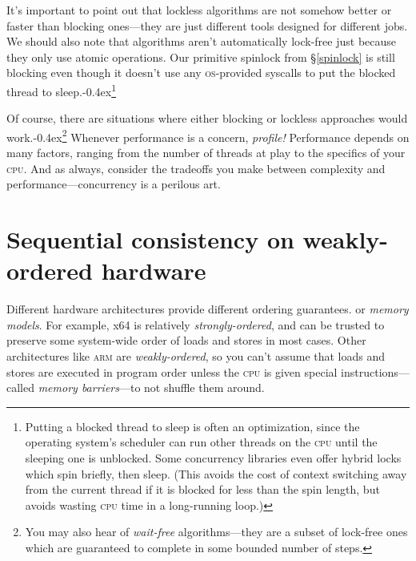 \documentclass[fontsize=\bodyfontsize, numbers=endperiod]{scrartcl}
\newcommand{\punckern}{\kern-0.4ex}
\newcommand{\introduce}[1]{\textit{#1}}
\newcommand{\secref}[1]{\hyperref[#1]{\textsc{\S}\ref*{#1}}}
\begin{document}
\begin{multicols}{2}
It's important to point out that lockless algorithms are not somehow better
or faster than blocking ones---they are just different tools
designed for different jobs.
We should also note that algorithms aren't automatically lock-free just because
they only use atomic operations.
Our primitive spinlock from \secref{spinlock} is still blocking
even though it doesn't use any \textsc{os}-provided syscalls to
put the blocked thread to sleep.\punckern\footnote{Putting a blocked thread
to sleep is often an optimization,
since the operating system's scheduler can run other threads on the \textsc{cpu}
until the sleeping one is unblocked.
Some concurrency libraries even offer hybrid locks which spin briefly,
then sleep.
(This avoids the cost of context switching away from the current thread if it
is blocked for less than the spin length, but avoids wasting \textsc{cpu}
time in a long-running loop.)}

Of course, there are situations where either blocking
or lockless approaches would work.\punckern\footnote{You
may also hear of \introduce{wait-free} algorithms---they are a subset of
lock-free ones which are guaranteed to complete in some
bounded number of steps.}
Whenever performance is a concern, \emph{profile!}
Performance depends on many factors,
ranging from the number of threads at
play to the specifics of your \textsc{cpu}.
And as always, consider the tradeoffs you make between
complexity and performance---concurrency is a perilous art.

\section{Sequential consistency on weakly-ordered hardware}

Different hardware architectures provide different ordering guarantees.
or \introduce{memory models}.
For example, x64 is relatively \introduce{strongly-ordered},
and can be trusted to preserve some system-wide order of
loads and stores in most cases.
Other architectures like \textsc{arm} are \introduce{weakly-ordered},
so you can't assume that loads and stores are executed in
program order unless the \textsc{cpu} is given special instructions---called
\introduce{memory barriers}---to not shuffle them around.


\end{multicols}
\end{document}

